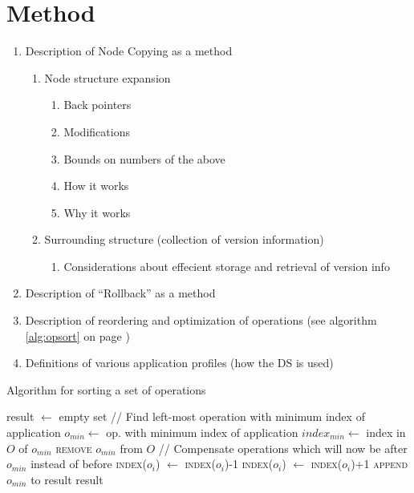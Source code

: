 \chapter{Method}

\begin{enumerate}
  \item Description of Node Copying as a method
  \begin{enumerate}
    \item Node structure expansion
    \begin{enumerate}
      \item Back pointers
      \item Modifications
      \item Bounds on numbers of the above
      \item How it works
      \item Why it works
    \end{enumerate}
    \item Surrounding structure (collection of version information)
    \begin{enumerate}
      \item Considerations about effecient storage and retrieval of version info
    \end{enumerate}
  \end{enumerate}
  \item Description of ``Rollback'' as a method
  \item Description of reordering and optimization of operations (see algorithm \ref{alg:opsort} on page \pageref{alg:opsort})
  \item Definitions of various application profiles (how the DS is used)
\end{enumerate}

\begin{algorithm}[!h]
  \caption{Algorithm for sorting a set of operations}
  \label{alg:opsort}
  \begin{algorithmic}
      \State result $\gets$ empty set
        \State // Find left-most operation with minimum index of application
        \State $o_{min} \gets$ op. with minimum index of application
        \State $index_{min} \gets$ index in $O$ of $o_{min}$
        \State \textsc{remove} $o_{min}$ from $O$
        \Statex
        \State // Compensate operations which will now be after $o_{min}$ instead of before
            \State \textsc{index}($o_i$) $\gets$ \textsc{index}($o_i$)-1
          \EndFor
            \State \textsc{index}($o_i$) $\gets$ \textsc{index}($o_i$)+1
          \EndFor
        \EndIf
        \State \textsc{append} $o_{min}$ to result
      \EndWhile
      \Statex
      \State \Return result
    \EndFunction
  \end{algorithmic}
\end{algorithm}




